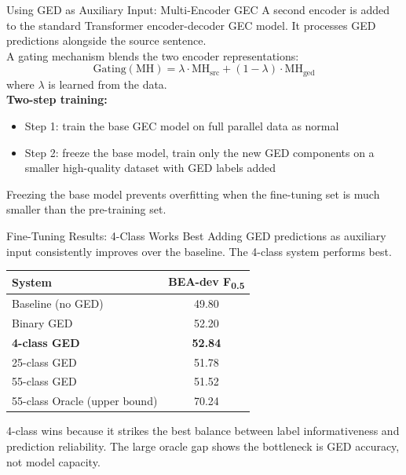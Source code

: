 \documentclass[aspectratio=169]{beamer}
\newcommand{\fhalf}{F\textsubscript{0.5}}
\begin{document}

\begin{frame}{Using GED as Auxiliary Input: Multi-Encoder GEC}
  A second encoder is added to the standard Transformer encoder-decoder
  GEC model. It processes GED predictions alongside the source sentence.\\[1em]

  A gating mechanism blends the two encoder representations:
  \[
    \text{Gating}(\text{MH}) = \lambda \cdot \text{MH}_\text{src}
    + (1 - \lambda) \cdot \text{MH}_\text{ged}
  \]
  where $\lambda$ is learned from the data.\\[1em]

  \textbf{Two-step training:}
  \begin{itemize}
    \item Step 1: train the base GEC model on full parallel data as normal
    \item Step 2: freeze the base model, train only the new GED components
      on a smaller high-quality dataset with GED labels added
  \end{itemize}

  Freezing the base model prevents overfitting when the fine-tuning
  set is much smaller than the pre-training set.
\end{frame}

\begin{frame}{Fine-Tuning Results: 4-Class Works Best}
  Adding GED predictions as auxiliary input consistently improves over
  the baseline. The 4-class system performs best.\\[1em]

  \begin{center}
  \begin{tabular}{lc}
    \toprule
    \textbf{System} & \textbf{BEA-dev \fhalf} \\
    \midrule
    Baseline (no GED) & 49.80 \\
    \midrule
    Binary GED & 52.20 \\
    \textbf{4-class GED} & \textbf{52.84} \\
    25-class GED & 51.78 \\
    55-class GED & 51.52 \\
    \midrule
    55-class Oracle (upper bound) & 70.24 \\
    \bottomrule
  \end{tabular}
  \end{center}

  \vspace{0.5em}
  4-class wins because it strikes the best balance between
  label informativeness and prediction reliability.
  The large oracle gap shows the bottleneck is GED accuracy, not model capacity.
\end{frame}
\end{document}
